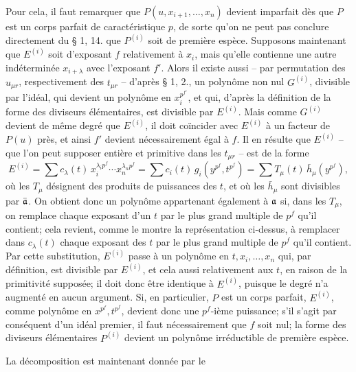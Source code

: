 Pour cela, il faut remarquer que $P(u,x_{i+1},\ldots,x_n)$ devient imparfait dès que $P$ est un corps parfait de caractéristique $p$, de sorte qu'on ne peut pas conclure directement du \S{} 1, 14. que $P^{(i)}$ soit de première espèce. Supposons maintenant que $E^{(i)}$ soit d'exposant $f$ relativement à $x_i$, mais qu'elle contienne une autre indéterminée $x_{i+\lambda}$ avec l'exposant $f'$. Alors il existe aussi -- par permutation des $u_{\mu r}$, respectivement des $t_{\mu r}$ -- d'après \S{} 1, 2., un polynôme non nul $G^{(i)}$, divisible par l'idéal, qui devient un polynôme en $x_i^{p^{f'}}$, et qui, d'après la définition de la forme des diviseurs élémentaires, est divisible par $E^{(i)}$. Mais comme $G^{(i)}$ devient de même degré que $E^{(i)}$, il doit coïncider avec $E^{(i)}$ à un facteur de $P(u)$ près, et ainsi $f'$ devient nécessairement égal à $f$. Il en résulte que $E^{(i)}$ -- que l'on peut supposer entière et primitive dans les $t_{\mu r}$ -- est de la forme
\[
 E^{(i)}=\sum c_\lambda(t)\,x_i^{\lambda_i p^f}\cdots x_n^{\lambda_n p^f}
       =\sum c_i(t)\,g_i(y^{p^f},t^{p^f})
       =\sum T_\mu(t)\,\bar h_\mu(y^{p^f}),
\]
où les $T_\mu$ désignent des produits de puissances des $t$, et où les $\bar h_\mu$ sont divisibles par $\bar{\mathfrak a}$. On obtient donc un polynôme appartenant également à $\mathfrak a$ si, dans les $T_\mu$, on remplace chaque exposant d'un $t$ par le plus grand multiple de $p^f$ qu'il contient; cela revient, comme le montre la représentation ci-dessus, à remplacer dans $c_\lambda(t)$ chaque exposant des $t$ par le plus grand multiple de $p^f$ qu'il contient. Par cette substitution, $E^{(i)}$ passe à un polynôme en $t,x_i,\ldots,x_n$ qui, par définition, est divisible par $E^{(i)}$, et cela aussi relativement aux $t$, en raison de la primitivité supposée; il doit donc être identique à $E^{(i)}$, puisque le degré n'a augmenté en aucun argument. Si, en particulier, $P$ est un corps parfait, $E^{(i)}$, comme polynôme en $x^{p^f},t^{p^f}$, devient donc une $p^f$-ième puissance; s'il s'agit par conséquent d'un idéal premier, il faut nécessairement que $f$ soit nul; la forme des diviseurs élémentaires $P^{(i)}$ devient un polynôme irréductible de première espèce.

La décomposition est maintenant donnée par le

